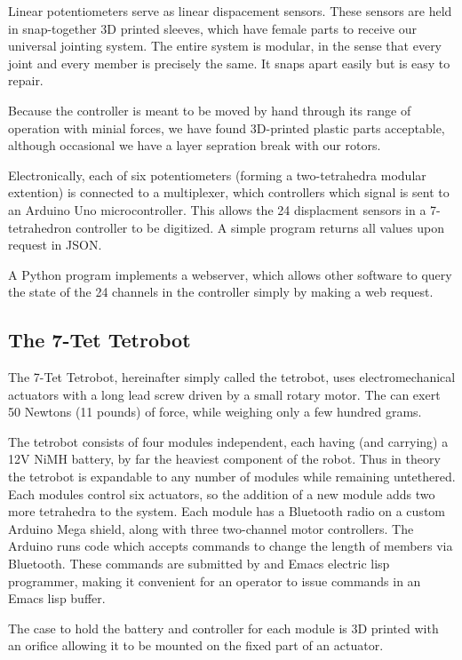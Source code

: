 \documentclass[conference]{IEEEtran}
\begin{document}
 Linear potentiometers serve as linear dispacement sensors.
 These sensors are held in snap-together 3D printed sleeves, which have
 female parts to receive our universal jointing system. The entire
 system is modular, in the sense that every joint and
 every member is precisely the same.
 It snaps apart easily but is easy to repair.

 Because the controller is meant to be moved by hand through its range of
 operation with minial forces, we have found 3D-printed plastic parts acceptable,
 although occasional we have a layer sepration break with our rotors.

 Electronically, each of six potentiometers (forming a two-tetrahedra
 modular extention) is connected to a multiplexer, which controllers
 which signal is sent to an Arduino Uno microcontroller. This allows
 the 24 displacment sensors in a 7-tetrahedron controller to be
 digitized. A simple program returns all values upon request in
 JSON.

 A Python program implements a webserver, which allows other software
 to query the state of the 24 channels in the controller simply by
 making a web request.

 \subsection{The 7-Tet Tetrobot}

The 7-Tet Tetrobot, hereinafter simply called the tetrobot,
uses electromechanical actuators with a long lead screw driven by a small
rotary motor. The can exert 50 Newtons (11 pounds) of force, while weighing only a few hundred grams.

The tetrobot consists of four modules independent, each having (and carrying) a 12V NiMH battery, by far
the heaviest component of the robot. Thus in theory the tetrobot is expandable to any number of modules
while remaining untethered. Each modules control six actuators, so the addition of a new module adds
two more tetrahedra to the system. Each module has a Bluetooth radio on a custom Arduino Mega shield,
along with three two-channel motor controllers. The Arduino runs code which accepts commands to change
the length of members via Bluetooth. These commands are submitted by and Emacs electric lisp programmer,
making it convenient for an operator to issue commands in an Emacs lisp buffer.

The case to hold the battery and controller for each module is 3D printed with an orifice allowing
it to be mounted on the fixed part of an actuator.
\end{document}
